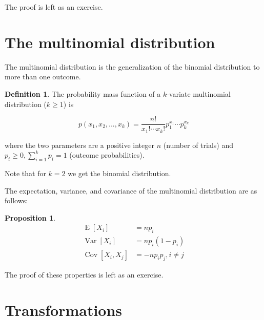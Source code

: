 \documentclass{book}
\theoremstyle{plain}%
\newtheorem{proposition}{Proposition}[section]
\theoremstyle{definition}
\newtheorem{definition}{Definition}[section]
\DeclareMathOperator{\Var}{Var}
\DeclareMathOperator{\Cov}{Cov}
\DeclareMathOperator{\E}{E}
\begin{document}
The proof is left as an exercise.

\section{The multinomial distribution}

The multinomial distribution is the generalization of the binomial distribution to more than one outcome.

\begin{definition}
The probability mass function of a $k$-variate multinomial distribution ($k \geq 1$) is

$$p(x_1,x_2,...,x_k) = \frac{n!}{x_1!\cdots x_k!} p_1^{x_1}\cdots p_k^{x_k}$$

where the two parameters are a positive integer $n$ (number of trials) and $p_i \geq 0, \sum_{i=1}^k p_i = 1$ (outcome probabilities).
\end{definition}

Note that for $k=2$ we get the binomial distribution.

The expectation, variance, and covariance of the multinomial distribution are as follows:

\begin{proposition}
\begin{align*}
\E[X_i] &= np_i\\
\Var[X_i] &= np_i(1-p_i)\\
\Cov[X_i,X_j] &= -np_ip_j, i \neq j
\end{align*}\label{prop:multinom}
\end{proposition}

The proof of these properties is left as an exercise.

\section{Transformations}
\end{document}
